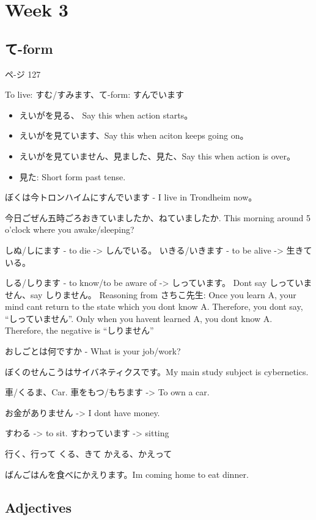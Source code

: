 \section{Week 3}
\subsection{て-form}
ペ-ジ 127

To live: すむ/すみます、て-form: すんでいます

\begin{itemize}
    \item えいがを見る、 Say this when action starts。
    \item えいがを見ています、Say this when aciton keeps going on。
    \item えいがを見ていません、見ました、見た、Say this when action is over。
    \item 見た: Short form past tense.
\end{itemize}


ぼくは今トロンハイムにすんでいます - I live in Trondheim now。

今日ごぜん五時ごろおきていましたか、ねていましたか. This morning around 5 o'clock where you awake/sleeping?

しぬ/しにます - to die -> しんでいる。
いきる/いきます - to be alive -> 生きている。

しる/しります - to know/to be aware of -> しっています。
Dont say しっていません、say しりません。
Reasoning from さちこ先生: Once you learn A, your mind cant return to the state which you dont know A. Therefore,
you dont say, “しっていません”. Only when you havent learned A, you dont know A. Therefore,
the negative is “しりません”

おしごとは何ですか - What is your job/work?

ぼくのせんこうはサイバネティクスです。My main study subject is cybernetics.

車/くるま、Car. 車をもつ/もちます -> To own a car.

お金がありません -> I dont have money.

すわる -> to sit. すわっています -> sitting

行く、行って
くる、きて
かえる、かえって

ばんごはんを食べにかえります。Im coming home to eat dinner.

\subsection{Adjectives}
